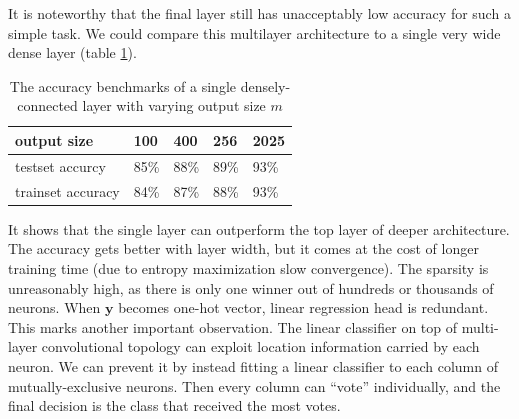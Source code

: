 \documentclass[12pt]{article}
\begin{document}
\begin{table}[]

	\caption{Each layer with even number uses slowness principle and its activations are randomly fixed. The odd layers do not fix their activations. The kernel size is 6x6 for odd and 1x1 for even layers. An interesting observation is that slowness allows for significant reduction in number of channels.}
	\label{table:ecc_accuracy_slow}
\end{table}
It is noteworthy that the final layer still has unacceptably low accuracy for such a simple task. We could compare this multilayer architecture to a single very wide dense layer (table \ref{table:ecc_accuracy_wide}).
\begin{table}[]
		\begin{tabular}{|lllll|}
			\hline
			output size      & 100  & 400  & 256  & 2025 \\ \hline
			testset accurcy & 85\% & 88\% & 89\% & 93\% \\ 
			trainset accuracy & 84\% & 87\% & 88\% & 93\% \\
			\hline
		\end{tabular}
	\caption{The accuracy benchmarks of a single densely-connected layer with varying output size $m$}
	\label{table:ecc_accuracy_wide}
\end{table}
It shows that the single layer can outperform the top layer of deeper architecture. The accuracy gets better with layer width, but it comes at the cost of longer training time (due to entropy maximization slow convergence). The sparsity is unreasonably high, as there is only one winner out of hundreds or thousands of neurons. When $\boldsymbol{y}$ becomes one-hot vector, linear regression head is redundant. This marks another important observation. The linear classifier on top of multi-layer convolutional topology can exploit location information carried by each neuron. We can prevent it by instead fitting a linear classifier to each column of mutually-exclusive neurons. Then every column can ``vote'' individually, and the final decision is the class that received the most votes. 
\end{document}

